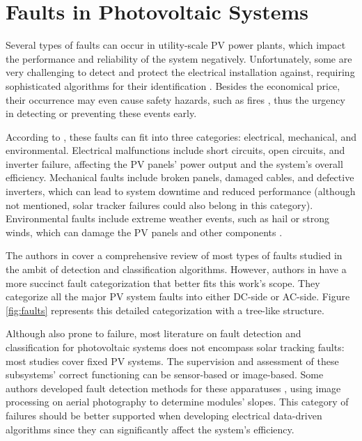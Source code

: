 \section{Faults in Photovoltaic Systems}

Several types of faults can occur in utility-scale PV power plants, which impact the performance and reliability of the system negatively. Unfortunately, some are very challenging to detect and protect the electrical installation against, requiring sophisticated algorithms for their identification \cite{Pillai2018}. Besides the economical price, their occurrence may even cause safety hazards, such as fires \cite{Alam2015}, thus the urgency in detecting or preventing these events early.

According to \cite{Pillai2018}, these faults can fit into three categories: electrical, mechanical, and environmental. Electrical malfunctions include short circuits, open circuits, and inverter failure, affecting the PV panels' power output and the system's overall efficiency. Mechanical faults include broken panels, damaged cables, and defective inverters, which can lead to system downtime and reduced performance (although not mentioned, solar tracker failures could also belong in this category). Environmental faults include extreme weather events, such as hail or strong winds, which can damage the PV panels and other components \cite{faults}.

The authors in \cite{Hong2022} cover a comprehensive review of most types of faults studied in the ambit of detection and classification algorithms. However, authors in \cite{Livera2019} have a more succinct fault categorization that better fits this work's scope. They categorize all the major PV system faults into either DC-side or AC-side. Figure \ref{fig:faults} represents this detailed categorization with a tree-like structure.

Although also prone to failure, most literature on fault detection and classification for photovoltaic systems does not encompass solar tracking faults: most studies cover fixed PV systems. The supervision and assessment of these subsystems' correct functioning can be sensor-based \cite{Stepanov2014} or image-based. Some authors developed fault detection methods for these apparatuses \cite{Amaral2021}, using image processing on aerial photography to determine modules' slopes. This category of failures should be better supported when developing electrical data-driven algorithms since they can significantly affect the system's efficiency.

